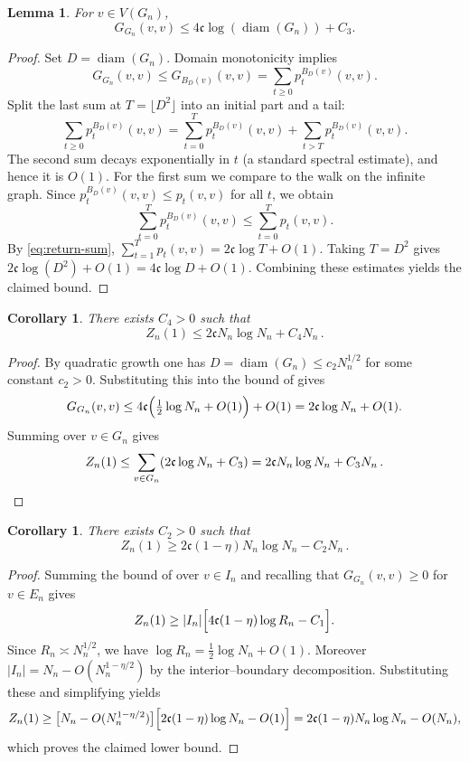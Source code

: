 \documentclass[11pt]{amsart}
\newtheorem{lemma}[theorem]{Lemma}
\newtheorem{corollary}[theorem]{Corollary}
\theoremstyle{remark}
\newcommand{\cG}{\mathfrak{c}}      %
\newcommand{\diam}{\operatorname{diam}}   %
\begin{document}
\begin{lemma}\label{lem:upper}
For $v\in V(G_n)$,
\[
  G_{G_n}(v,v) \leq 4\cG \log(\diam(G_n)) + C_3.
\]
\end{lemma}

\begin{proof}
Set $D = \diam(G_n)$.  Domain monotonicity implies
\[
  G_{G_n}(v,v) \le G_{B_D(v)}(v,v) = \sum_{t\ge 0} p_t^{B_D(v)}(v,v).
\]
Split the last sum at $T=\lfloor D^2\rfloor$ into an initial part and a tail:
\[
  \sum_{t\ge 0} p_t^{B_D(v)}(v,v) = \sum_{t=0}^{T} p_t^{B_D(v)}(v,v) + \sum_{t>T} p_t^{B_D(v)}(v,v).
\]
The second sum decays exponentially in $t$ (a standard spectral estimate), and hence it is $O(1)$.  For the first sum we compare to the walk on the infinite graph.  Since $p_t^{B_D(v)}(v,v) \le p_t(v,v)$ for all $t$, we obtain
\[
  \sum_{t=0}^{T} p_t^{B_D(v)}(v,v) \le \sum_{t=0}^{T} p_t(v,v).
\]
By \eqref{eq:return-sum}, $\sum_{t=1}^{T} p_t(v,v) = 2\cG \log T + O(1)$.  Taking $T=D^2$ gives $2\cG \log(D^2)+O(1)=4\cG\log D+O(1)$.  Combining these estimates yields the claimed bound.
\end{proof}

\begin{corollary}\label{cor:upper}
There exists $C_4>0$ such that
\[
  Z_n(1) \le 2\cG N_n \log N_n + C_4 N_n\,.
\]
\end{corollary}

\begin{proof}
By quadratic growth one has $D = \diam(G_n) \le c_2 N_n^{1/2}$ for some constant $c_2>0$.  Substituting this into the bound of  gives
\[
  G_{G_n}(v,v) \le 4\cG\Bigl(\tfrac{1}{2} \log N_n + O(1)\Bigr) + O(1)
  = 2\cG \log N_n + O(1).
\]
Summing over $v \in G_n$ gives
\[
  Z_n(1) \le \sum_{v \in G_n} (2\cG \log N_n + C_3) = 2\cG N_n \log N_n + C_3 N_n\,.\qedhere
\]
\end{proof}
 
\begin{corollary}\label{cor:lower}
There exists $C_2>0$ such that
\[
  Z_n(1) \ge 2\cG(1-\eta) N_n\log N_n - C_2 N_n\,.
\]
\end{corollary}

\begin{proof}
Summing the bound of  over $v\in I_n$ and recalling that $G_{G_n}(v,v)\ge0$ for $v\in E_n$ gives
\[
  Z_n(1) \ge |I_n|\Bigl[4\cG(1-\eta)\log R_n - C_1\Bigr].
\]
Since $R_n\asymp N_n^{1/2}$, we have $\log R_n = \tfrac12 \log N_n + O(1)$.  Moreover $|I_n| = N_n - O(N_n^{1-\eta/2})$ by the interior–boundary decomposition.  Substituting these and simplifying yields
\[
  Z_n(1) \ge \bigl[N_n - O(N_n^{1-\eta/2})\bigr]\Bigl[2\cG(1-\eta)\log N_n - O(1)\Bigr]
  = 2\cG(1-\eta) N_n \log N_n - O(N_n),
\]
which proves the claimed lower bound.
\end{proof}
 
\end{document}
